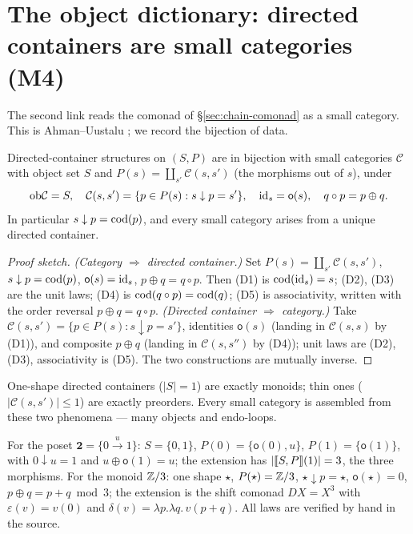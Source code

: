 \section{The object dictionary: directed containers are small categories (M4)}\label{sec:chain-dictionary}

The second link reads the comonad of \S\ref{sec:chain-comonad} as a small
category. This is Ahman--Uustalu \cite{AU16}; we record the bijection of data.

\begin{theorem}\label{thm:chain-dictionary}
Directed-container structures on $(S,P)$ are in bijection with small categories
$\mathcal C$ with object set $S$ and $P(s)=\coprod_{s'}\mathcal C(s,s')$ (the
morphisms out of $s$), under
\[
  \mathrm{ob}\mathcal C=S,\quad
  \mathcal C(s,s')=\{p\in P(s):s\downarrow p=s'\},\quad
  \mathrm{id}_s=\mathsf o(s),\quad
  q\circ p=p\oplus q.
\]
In particular $s\downarrow p=\operatorname{cod}(p)$, and every small category arises from a
unique directed container.
\end{theorem}

\begin{proof}[Proof sketch]
\emph{(Category $\Rightarrow$ directed container.)} Set
$P(s)=\coprod_{s'}\mathcal C(s,s')$, $s\downarrow p=\operatorname{cod}(p)$,
$\mathsf o(s)=\mathrm{id}_s$, $p\oplus q=q\circ p$. Then (D1) is $\operatorname{cod}(\mathrm{id}_s)=s$; (D2),
(D3) are the unit laws; (D4) is $\operatorname{cod}(q\circ p)=\operatorname{cod}(q)$; (D5) is associativity,
written with the order reversal $p\oplus q=q\circ p$.
\emph{(Directed container $\Rightarrow$ category.)} Take
$\mathcal C(s,s')=\{p\in P(s):s\downarrow p=s'\}$, identities $\mathsf o(s)$
(landing in $\mathcal C(s,s)$ by (D1)), and composite $p\oplus q$ (landing in
$\mathcal C(s,s'')$ by (D4)); unit laws are (D2),(D3), associativity is (D5).
The two constructions are mutually inverse.
\end{proof}

\begin{corollary}\label{cor:chain-atoms}
One-shape directed containers ($|S|=1$) are exactly monoids; thin ones
($|\mathcal C(s,s')|\le1$) are exactly preorders. Every small category is
assembled from these two phenomena --- many objects and endo-loops.
\end{corollary}

\begin{example}\label{ex:chain-atoms}
For the poset $\mathbf 2=\{0\xrightarrow{u}1\}$: $S=\{0,1\}$,
$P(0)=\{\mathsf o(0),u\}$, $P(1)=\{\mathsf o(1)\}$, with $0\downarrow u=1$ and
$u\oplus\mathsf o(1)=u$; the extension has $|\llbracket S,P \rrbracket(1)|=3$, the three
morphisms. For the monoid $\mathbb{Z}/3$: one shape $\star$, $P(\star)=\mathbb{Z}/3$,
$\star\downarrow p=\star$, $\mathsf o(\star)=0$, $p\oplus q=p+q\bmod 3$; the
extension is the shift comonad $DX=X^{3}$ with $\varepsilon(v)=v(0)$ and
$\delta(v)=\lambda p.\lambda q.\,v(p+q)$. All laws are verified by hand in the
source.
\end{example}

